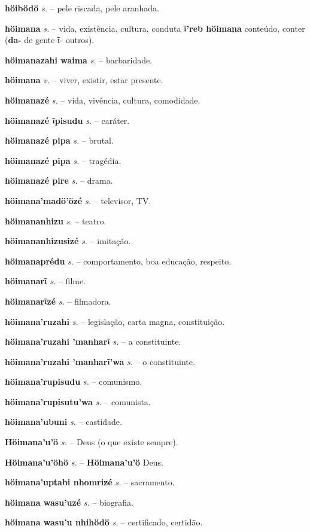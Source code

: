 \textbf{höibödö} \textit{s.} -- pele riscada, pele aranhada.

\textbf{höimana} \textit{s.} -- vida, existência, cultura, conduta  \textbf{ĩ'reb höimana} conteúdo, conter (\textbf{da-} de gente  \textbf{ĩ}- outros).

\textbf{höimanazahi waima} \textit{s.} -- barbaridade.

\textbf{höimana} \textit{v.} -- viver, existir, estar presente.

\textbf{höimanazé} \textit{s.} -- vida, vivência, cultura, comodidade.

\textbf{höimanazé ĩpisudu} \textit{s.} -- caráter.

\textbf{höimanazé pipa} \textit{s.} -- brutal.

\textbf{höimanazé pipa} \textit{s.} -- tragédia.

\textbf{höimanazé pire} \textit{s.} -- drama.

\textbf{höimana'madö'özé} \textit{s.} -- televisor, TV.

\textbf{höimananhizu} \textit{s.} -- teatro.

\textbf{höimananhizusizé} \textit{s.} -- imitação.

\textbf{höimanaprédu} \textit{s.} -- comportamento, boa educação, respeito.

\textbf{höimanarĩ} \textit{s.} -- filme.

\textbf{höimanarĩzé} \textit{s.} -- filmadora.

\textbf{höimana'ruzahi} \textit{s.} -- legislação, carta magna, constituição.

\textbf{höimana'ruzahi 'manharĩ} \textit{s.} -- a constituinte.

\textbf{höimana'ruzahi 'manharĩ'wa} \textit{s.} -- o constituinte.

\textbf{höimana'rupisudu} \textit{s.} -- comunismo.

\textbf{höimana'rupisutu'wa} \textit{s.} -- comunista.

\textbf{höimana'ubuni} \textit{s.} -- castidade.

\textbf{Höimana'u'ö} \textit{s.} -- Deus (o que existe sempre).

\textbf{Höimana'u'öhö} \textit{s.} -- \textbf{Höimana'u'ö} Deus.

\textbf{höimana'uptabi nhomrizé} \textit{s.} -- sacramento.

\textbf{höimana wasu'uzé} \textit{s.} -- biografia.

\textbf{höimana wasu'u nhihödö} \textit{s.} -- certificado, certidão.

